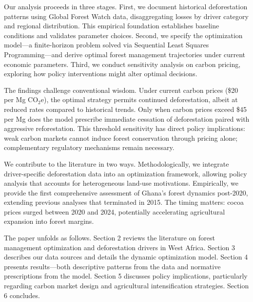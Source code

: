 Our analysis proceeds in three stages. First, we document historical deforestation patterns using Global Forest Watch data, disaggregating losses by driver category and regional distribution. This empirical foundation establishes baseline conditions and validates parameter choices. Second, we specify the optimization model—a finite-horizon problem solved via Sequential Least Squares Programming—and derive optimal forest management trajectories under current economic parameters. Third, we conduct sensitivity analysis on carbon pricing, exploring how policy interventions might alter optimal decisions.

The findings challenge conventional wisdom. Under current carbon prices (\$20 per Mg CO$_2$e), the optimal strategy permits continued deforestation, albeit at reduced rates compared to historical trends. Only when carbon prices exceed \$45 per Mg does the model prescribe immediate cessation of deforestation paired with aggressive reforestation. This threshold sensitivity has direct policy implications: weak carbon markets cannot induce forest conservation through pricing alone; complementary regulatory mechanisms remain necessary.

We contribute to the literature in two ways. Methodologically, we integrate driver-specific deforestation data into an optimization framework, allowing policy analysis that accounts for heterogeneous land-use motivations. Empirically, we provide the first comprehensive assessment of Ghana's forest dynamics post-2020, extending previous analyses that terminated in 2015. The timing matters: cocoa prices surged between 2020 and 2024, potentially accelerating agricultural expansion into forest margins.

The paper unfolds as follows. Section 2 reviews the literature on forest management optimization and deforestation drivers in West Africa. Section 3 describes our data sources and details the dynamic optimization model. Section 4 presents results—both descriptive patterns from the data and normative prescriptions from the model. Section 5 discusses policy implications, particularly regarding carbon market design and agricultural intensification strategies. Section 6 concludes.
